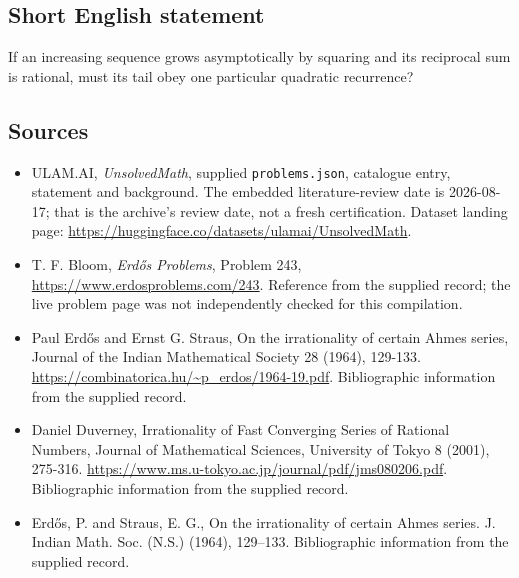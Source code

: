 \documentclass[11pt,a4paper]{article}
\begin{document}
\subsection{Short English statement}

If an increasing sequence grows asymptotically by squaring and its reciprocal sum is rational, must its tail obey one particular quadratic recurrence?

\subsection{Sources}

{\small

\begin{itemize}

\item[\hypertarget{source:statement:1}{S1}] ULAM.AI, \emph{UnsolvedMath}, supplied \texttt{problems.json}, catalogue entry, statement and background. The embedded literature-review date is 2026-08-17; that is the archive’s review date, not a fresh certification. Dataset landing page: \url{https://huggingface.co/datasets/ulamai/UnsolvedMath}.

\item[\hypertarget{source:statement:2}{S2}] T. F. Bloom, \emph{Erdős Problems}, Problem 243, \url{https://www.erdosproblems.com/243}. Reference from the supplied record; the live problem page was not independently checked for this compilation.

\item[\hypertarget{source:statement:3}{S3}] Paul Erdős and Ernst G. Straus, On the irrationality of certain Ahmes series, Journal of the Indian Mathematical Society 28 (1964), 129-133. \url{https://combinatorica.hu/~p_erdos/1964-19.pdf}. Bibliographic information from the supplied record.

\item[\hypertarget{source:statement:4}{S4}] Daniel Duverney, Irrationality of Fast Converging Series of Rational Numbers, Journal of Mathematical Sciences, University of Tokyo 8 (2001), 275-316. \url{https://www.ms.u-tokyo.ac.jp/journal/pdf/jms080206.pdf}. Bibliographic information from the supplied record.

\item[\hypertarget{source:statement:5}{S5}] Erd\H{o}s, P. and Straus, E. G., On the irrationality of certain {A}hmes series. J. Indian Math. Soc. (N.S.) (1964), 129--133. Bibliographic information from the supplied record.

\end{itemize}

}

\label{end:statement}
\end{document}
